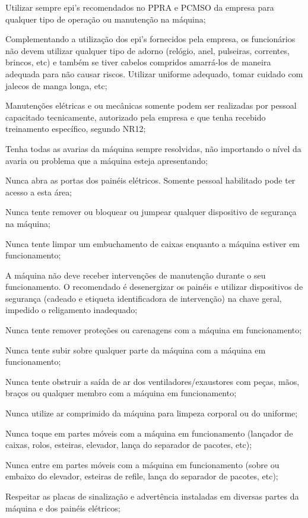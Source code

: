 \begin{generalSafetyRules}
    \item Utilizar sempre epi's recomendados no PPRA e PCMSO da empresa para qualquer tipo de operação ou
manutenção na máquina;
    \item  Complementando a utilização dos epi's fornecidos pela empresa, os funcionários não devem utilizar
qualquer tipo de adorno (relógio, anel, pulseiras, correntes, brincos, etc) e também se tiver cabelos compridos
amarrá-los de maneira adequada para não causar riscos. Utilizar uniforme adequado, tomar cuidado com jalecos
de manga longa, etc;
    \item Manutenções elétricas e ou mecânicas somente podem ser realizadas por pessoal capacitado
tecnicamente, autorizado pela empresa e que tenha recebido treinamento específico, segundo NR12;
    \item Tenha todas as avarias da máquina sempre resolvidas, não importando o nível da avaria ou problema que a
máquina esteja apresentando;
    \item Nunca abra as portas dos painéis elétricos. Somente pessoal habilitado pode ter acesso a esta área;
    \item Nunca tente remover ou bloquear ou jumpear qualquer dispositivo de segurança na máquina;
    \item Nunca tente limpar um embuchamento de caixas enquanto a máquina estiver em funcionamento;
    \item A máquina não deve receber intervenções de manutenção durante o seu funcionamento. O recomendado é
desenergizar os painéis e utilizar dispositivos de segurança (cadeado e etiqueta identificadora de intervenção) na
chave geral, impedido o religamento inadequado;
    \item Nunca tente remover proteções ou carenagens com a máquina em funcionamento;
    \item Nunca tente subir sobre qualquer parte da máquina com a máquina em funcionamento;
    \item Nunca tente obstruir a saída de ar dos ventiladores/exaustores com peças, mãos, braços ou qualquer
membro com a máquina em funcionamento;
    \item Nunca utilize ar comprimido da máquina para limpeza corporal ou do uniforme;
    \item Nunca toque em partes móveis com a máquina em funcionamento (lançador de caixas, rolos, esteiras,
elevador, lança do separador de pacotes, etc);
    \item Nunca entre em partes móveis com a máquina em funcionamento (sobre ou embaixo do elevador, esteiras
de refile, lança do separador de pacotes, etc);
    \item Respeitar as placas de sinalização e advertência instaladas em diversas partes da máquina e dos painéis
elétricos;



\newpage
\thispagestyle{fancy}
\vspace*{40 pt}


\end{generalSafetyRules}
